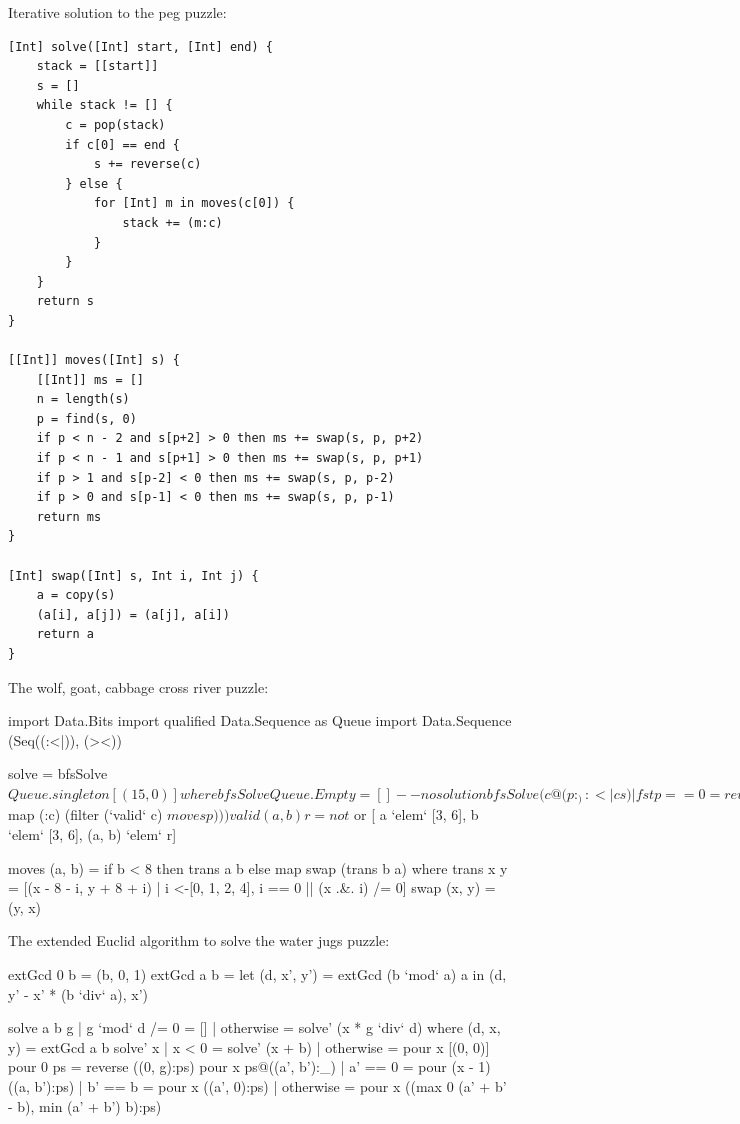 \documentclass[b5paper]{article}
\begin{document}
Iterative solution to the peg puzzle:

\begin{lstlisting}[language = Bourbaki]
[Int] solve([Int] start, [Int] end) {
    stack = [[start]]
    s = []
    while stack != [] {
        c = pop(stack)
        if c[0] == end {
            s += reverse(c)
        } else {
            for [Int] m in moves(c[0]) {
                stack += (m:c)
            }
        }
    }
    return s
}

[[Int]] moves([Int] s) {
    [[Int]] ms = []
    n = length(s)
    p = find(s, 0)
    if p < n - 2 and s[p+2] > 0 then ms += swap(s, p, p+2)
    if p < n - 1 and s[p+1] > 0 then ms += swap(s, p, p+1)
    if p > 1 and s[p-2] < 0 then ms += swap(s, p, p-2)
    if p > 0 and s[p-1] < 0 then ms += swap(s, p, p-1)
    return ms
}

[Int] swap([Int] s, Int i, Int j) {
    a = copy(s)
    (a[i], a[j]) = (a[j], a[i])
    return a
}
\end{lstlisting}

The wolf, goat, cabbage cross river puzzle:

\begin{Haskell}
import Data.Bits
import qualified Data.Sequence as Queue
import Data.Sequence (Seq((:<|)), (><))

solve = bfsSolve $ Queue.singleton [(15, 0)] where
  bfsSolve Queue.Empty = [] -- no solution
  bfsSolve (c@(p:_) :<| cs)
    | fst p == 0 = reverse c
    | otherwise = bfsSolve (cs >< (Queue.fromList $ map (:c)
                                    (filter (`valid` c) $ moves p)))

valid (a, b) r = not $ or [ a `elem` [3, 6], b `elem` [3, 6], (a, b) `elem` r]

moves (a, b) = if b < 8 then trans a b else map swap (trans b a) where
    trans x y = [(x - 8 - i, y + 8 + i)
                     | i <-[0, 1, 2, 4], i == 0 || (x .&. i) /= 0]
    swap (x, y) = (y, x)
\end{Haskell}

The extended Euclid algorithm to solve the water jugs puzzle:

\begin{Haskell}
extGcd 0 b = (b, 0, 1)
extGcd a b = let (d, x', y') = extGcd (b `mod` a) a in
               (d, y' - x' * (b `div` a), x')

solve a b g | g `mod` d /= 0 = []
            | otherwise = solve' (x * g `div` d)
    where
      (d, x, y) = extGcd a b
      solve' x | x < 0 = solve' (x + b)
               | otherwise = pour x [(0, 0)]
      pour 0 ps = reverse ((0, g):ps)
      pour x ps@((a', b'):_) | a' == 0 = pour (x - 1) ((a, b'):ps)
                             | b' == b = pour x ((a', 0):ps)
                             | otherwise = pour x ((max 0 (a' + b' - b),
                                                    min (a' + b') b):ps)
\end{Haskell}
\end{document}
